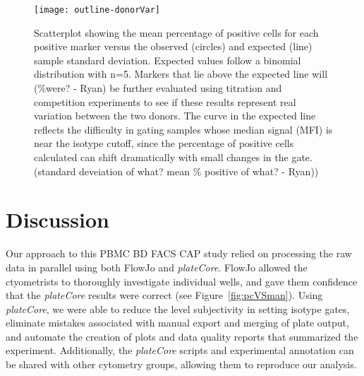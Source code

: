 \documentclass[12pt]{article}
\newcommand{\Rpackage}[1]{{\textit{#1}}}
\begin{document}
\begin{figure}
\centering
\texttt{[image: outline-donorVar]}
\caption{Scatterplot showing the mean percentage of positive cells for each
positive marker versus the observed (circles) and expected (line) sample
standard deviation. Expected values follow a binomial distribution with n=5.
Markers that lie above the expected line will (\%were? - Ryan) be further
evaluated using titration and competition experiments to see if these results
represent real variation between the two donors. The curve in the expected line
reflects the difficulty in gating samples whose median signal (MFI) is near the
isotype cutoff, since the percentage of positive cells calculated can shift
dramatically with small changes in the gate. (standard deveiation of what? mean
\% positive of what? - Ryan)) }
\label{fig:donorVar}
\end{figure}

%
%
%
%
%
%


\clearpage
\section*{Discussion}

Our approach to this PBMC BD FACS CAP study relied on processing the raw data
in parallel using both FlowJo and \Rpackage{plateCore}. FlowJo allowed the
ctyometrists to thoroughly investigate individual wells, and gave them
confidence that the \Rpackage{plateCore} results were correct (see
Figure~\ref{fig:pcVSman}). Using \Rpackage{plateCore}, we were able to reduce
the level subjectivity in setting isotype gates, eliminate mistakes associated
with manual export and merging of plate output, and automate the creation of
plots and data quality reports that summarized the experiment. Additionally,
the \Rpackage{plateCore} scripts and experimental annotation can be shared with
other cytometry groups, allowing them to reproduce our analysis.
\end{document}
